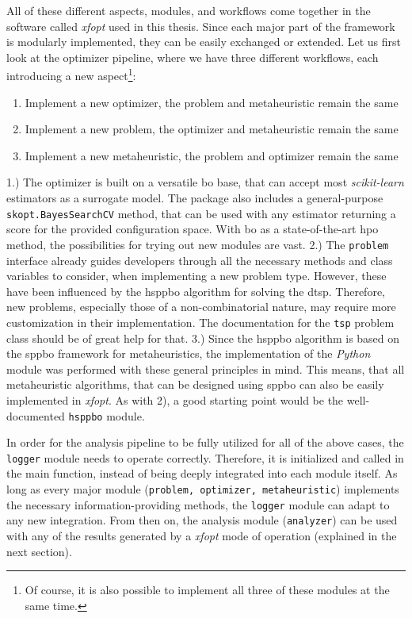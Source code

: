 All of these different aspects, modules, and workflows come together in the software called \textit{\gls{xfopt}} used in this thesis. Since each major part of the framework is
modularly implemented, they can be easily exchanged or extended. Let us first look at the optimizer pipeline, where we have three different workflows, each introducing a new aspect\footnote{Of course, it is also possible to implement all three of these modules at the same time.}:
\begin{enumerate}
	\item Implement a new optimizer, the problem and metaheuristic remain the same 
	\item Implement a new problem, the optimizer and metaheuristic remain the same 
	\item Implement a new metaheuristic, the problem and optimizer remain the same
\end{enumerate}
1.) The optimizer is built on a versatile \gls{bo} base, that can accept most \textit{scikit-learn} estimators as a surrogate model. The package also includes a general-purpose \texttt{skopt.BayesSearchCV} method, that can be used with any estimator returning a score for the provided configuration space. With \gls{bo} as a state-of-the-art \glsdesc{hpo} method, the possibilities for trying out new modules are vast.
2.) The \texttt{problem} interface already guides developers through all the necessary methods and class variables to consider, when implementing a new problem type. However, these have been influenced by the \gls{hsppbo} algorithm for solving the \gls{dtsp}. Therefore, new problems, especially those of a non-combinatorial nature, may require more customization in their implementation. The documentation for the \texttt{tsp} problem class should be of great help for that.
3.) Since the \gls{hsppbo} algorithm is based on the \gls{sppbo} framework for metaheuristics, the implementation of the \textit{Python} module was performed with these general principles in mind. This means, that all metaheuristic algorithms, that can be designed using \gls{sppbo} can also be easily implemented in \textit{\gls{xfopt}}. As with 2), a good starting point would be the well-documented \texttt{hsppbo} module.
 
In order for the analysis pipeline to be fully utilized for all of the above cases, the \texttt{logger} module needs to operate correctly. Therefore, it is initialized and called in the main function, instead of being deeply integrated into each module itself. As long as every major module (\texttt{problem, optimizer, metaheuristic}) implements the necessary information-providing methods, the \texttt{logger} module can adapt to any new integration. From then on, the analysis module (\texttt{analyzer}) can be used with any of the results generated by a \textit{\gls{xfopt}} mode of operation (explained in the next section).

